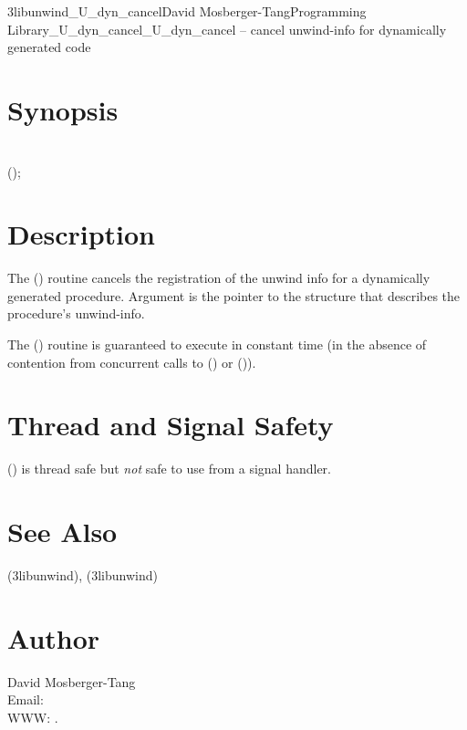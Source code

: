 \documentclass{article}
\begin{document}
\begin{Name}{3libunwind}{\_U\_dyn\_cancel}{David Mosberger-Tang}{Programming Library}{\_U\_dyn\_cancel}\_U\_dyn\_cancel -- cancel unwind-info for dynamically generated code
\end{Name}

\section{Synopsis}

\\

 ();\\

\section{Description}

The () routine cancels the registration of the
unwind info for a dynamically generated procedure.  Argument 
is the pointer to the  structure that
describes the procedure's unwind-info.

The () routine is guaranteed to execute in
constant time (in the absence of contention from concurrent calls to
() or ()).


\section{Thread and Signal Safety}

() is thread safe but \emph{not} safe to use
from a signal handler.

\section{See Also}

(3libunwind),
(3libunwind)

\section{Author}

\noindent
David Mosberger-Tang\\
Email: \\
WWW: .
\LatexManEnd
\end{document}
